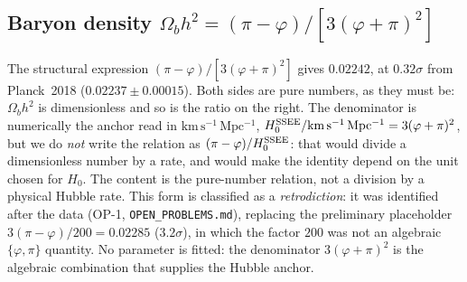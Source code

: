 \documentclass[12pt,a4paper]{article}
\newcommand{\kmsu}{\mathrm{km\,s^{-1}\,Mpc^{-1}}}
\begin{document}
\subsection*{Baryon density $\Omega_b h^2 = (\pi-\varphi)/[3(\varphi+\pi)^2]$}

The structural expression $(\pi-\varphi)/[3(\varphi+\pi)^2]$
gives $0.02242$, at $0.32\sigma$ from Planck~2018 ($0.02237\pm0.00015$).
Both sides are pure numbers, as they must be: $\Omega_b h^2$ is dimensionless and
so is the ratio on the right.  The denominator is numerically the anchor read in
$\kmsu$, $H_0^{\rm SSEE}/\kmsu = 3(\varphi+\pi)^2$, but we do \emph{not} write the
relation as $(\pi-\varphi)/H_0^{\rm SSEE}$: that would divide a dimensionless
number by a rate, and would make the identity depend on the unit chosen for
$H_0$.  The content is the pure-number relation, not a division by a physical
Hubble rate.
This form is classified as a \emph{retrodiction}: it was identified after the data
(OP-1, \texttt{OPEN\_PROBLEMS.md}), replacing the preliminary placeholder
$3(\pi-\varphi)/200 = 0.02285$ ($3.2\sigma$), in which the factor $200$ was not an
algebraic $\{\varphi,\pi\}$ quantity. No parameter is fitted: the denominator
$3(\varphi+\pi)^2$ is the algebraic combination that supplies the Hubble anchor.
\end{document}
